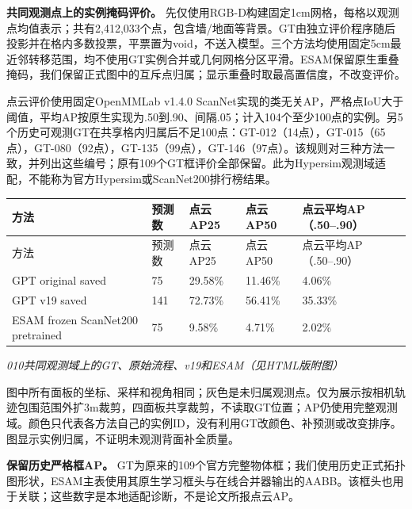 \documentclass[UTF8,fontset=fandol]{ctexart}
\begin{document}
\textbf{共同观测点上的实例掩码评价。} 先仅使用RGB-D构建固定1cm网格，每格以观测点均值表示；共有2,412,033个点，包含墙/地面等背景。GT由独立评价程序随后投影并在格内多数投票，平票置为void，不送入模型。三个方法均使用固定5cm最近邻转移范围，均不使用GT实例合并或几何网格分区平滑。ESAM保留原生重叠掩码，我们保留正式图中的互斥点归属；显示重叠时取最高置信度，不改变评价。



点云评价使用固定OpenMMLab v1.4.0 ScanNet实现的类无关AP，严格点IoU大于阈值，平均AP按原生实现为.50到.90、间隔.05；计入104个至少100点的实例。另5个历史可观测GT在共享格内归属后不足100点：GT-012（14点），GT-015（65点），GT-080（92点），GT-135（99点），GT-146（97点）。该规则对三种方法一致，并列出这些编号；原有109个GT框评价全部保留。此为Hypersim观测域适配，不能称为官方Hypersim或ScanNet200排行榜结果。



{\small
\begin{longtable}{|p{}|p{}|p{}|p{}|p{}|}
\hline
方法 & 预测数 & 点云AP25 & 点云AP50 & 点云平均AP（.50–.90） \\ \hline
\endfirsthead
\hline
方法 & 预测数 & 点云AP25 & 点云AP50 & 点云平均AP（.50–.90） \\ \hline
\endhead
GPT original saved & 75 & 29.58\% & 11.46\% & 4.06\% \\ \hline
GPT v19 saved & 141 & 72.73\% & 56.41\% & 35.33\% \\ \hline
ESAM frozen ScanNet200 pretrained & 75 & 9.58\% & 4.71\% & 2.02\% \\ \hline
\end{longtable}
}

\textit{010共同观测域上的GT、原始流程、v19和ESAM（见HTML版附图）}



图中所有面板的坐标、采样和视角相同；灰色是未归属观测点。仅为展示按相机轨迹包围范围外扩3m裁剪，四面板共享裁剪，不读取GT位置；AP仍使用完整观测域。颜色只代表各方法自己的实例ID，没有利用GT改颜色、补预测或改变排序。图显示实例归属，不证明未观测背面补全质量。



\textbf{保留历史严格框AP。} GT为原来的109个官方完整物体框；我们使用历史正式拓扑图形状，ESAM主表使用其原生学习框头与在线合并器输出的AABB。该框头也用于关联；这些数字是本地适配诊断，不是论文所报点云AP。
\end{document}
